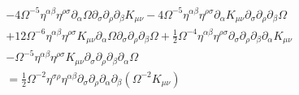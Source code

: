 \documentclass[10pt,letterpaper]{article}
\begin{document}
\begin{align}
 &- 4\Omega^{-5} \eta^{\alpha \beta} \eta^{\rho \sigma} \partial_{\alpha}\Omega \partial_{\sigma}\partial_{\rho}\partial_{\beta}K_{\mu \nu}- 4 \Omega^{-5}\eta^{\alpha \beta} \eta^{\rho \sigma} \partial_{\alpha}K_{\mu \nu} \partial_{\sigma}\partial_{\rho}\partial_{\beta}\Omega\nonumber \\
 & + 12\Omega^{-6} \eta^{\alpha \beta} \eta^{\rho \sigma} K_{\mu \nu} \partial_{\alpha}\Omega \partial_{\sigma}\partial_{\rho}\partial_{\beta}\Omega + \tfrac{1}{2}\Omega^{-4} \eta^{\alpha \beta} \eta^{\rho \sigma} \partial_{\sigma}\partial_{\rho}\partial_{\beta}\partial_{\alpha}K_{\mu \nu}\nonumber \\
 &-  \Omega^{-5}\eta^{\alpha \beta} \eta^{\rho \sigma} K_{\mu \nu} \partial_{\sigma}\partial_{\rho}\partial_{\beta}\partial_{\alpha}\Omega \nonumber \\
&= \frac12 \Omega^{-2} \eta^{\sigma\rho}\eta^{\alpha\beta}\partial_\sigma\partial_\rho\partial_\alpha \partial_\beta (\Omega^{-2}K_{\mu\nu}) 
\end{align}
\end{document}

